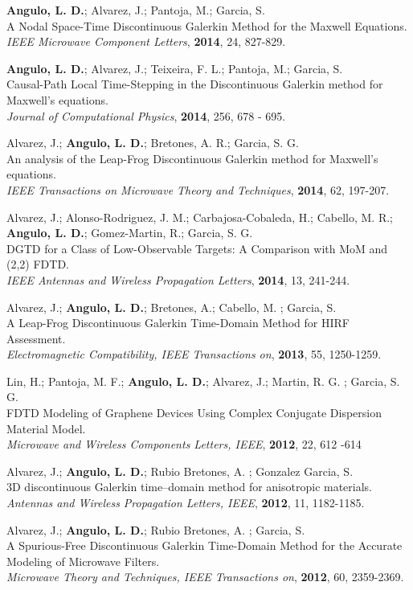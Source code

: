 \documentclass[margin,line]{res}
\begin{document}
{\bf Angulo, L. D.}; Alvarez, J.; Pantoja, M.; Garcia, S.\\
A Nodal Space-Time Discontinuous Galerkin Method for the Maxwell Equations.\\
{\it IEEE Microwave Component Letters}, {\bf 2014}, 24, 827-829.

{\bf Angulo, L. D.}; Alvarez, J.; Teixeira, F. L.; Pantoja, M.; Garcia, S.\\
Causal-Path Local Time-Stepping in the Discontinuous Galerkin method for Maxwell's equations.\\
{\it Journal of Computational Physics}, {\bf 2014}, 256, 678 - 695.

Alvarez, J.; {\bf Angulo, L. D.}; Bretones, A. R.; Garcia, S. G.\\
An analysis of the Leap-Frog Discontinuous Galerkin method for Maxwell’s equations.\\
{\it IEEE Transactions on Microwave Theory and Techniques}, {\bf 2014}, 62, 197-207.

Alvarez, J.; Alonso-Rodriguez, J. M.; Carbajosa-Cobaleda, H.; Cabello, M. R.; {\bf Angulo, L. D.}; Gomez-Martin, R.; Garcia, S. G.\\
DGTD for a Class of Low-Observable Targets: A Comparison with MoM and (2,2) FDTD.\\
{\it IEEE Antennas and Wireless Propagation Letters}, {\bf 2014}, 13, 241-244.

Alvarez, J.; {\bf Angulo, L. D.}; Bretones, A.; Cabello, M. ; Garcia, S.\\
A Leap-Frog Discontinuous Galerkin Time-Domain Method for HIRF Assessment.\\
{\it Electromagnetic Compatibility, IEEE Transactions on}, {\bf 2013}, 55, 1250-1259.

Lin, H.; Pantoja, M. F.; {\bf Angulo, L. D.}; Alvarez, J.; Martin, R. G. ; Garcia, S. G.\\
FDTD Modeling of Graphene Devices Using Complex Conjugate Dispersion Material Model.\\
{\it Microwave and Wireless Components Letters, IEEE}, {\bf 2012}, 22, 612 -614

Alvarez, J.; {\bf Angulo, L. D.}; Rubio Bretones, A. ; Gonzalez Garcia, S.\\
3D discontinuous Galerkin time--domain method for anisotropic materials.\\
{\it Antennas and Wireless Propagation Letters, IEEE}, {\bf 2012}, 11, 1182-1185.

Alvarez, J.; {\bf Angulo, L. D.}; Rubio Bretones, A. ; Garcia, S.\\
A Spurious-Free Discontinuous Galerkin Time-Domain Method for the Accurate Modeling of Microwave Filters.\\
{\it Microwave Theory and Techniques, IEEE Transactions on}, {\bf 2012}, 60, 2359-2369.
\end{document}
